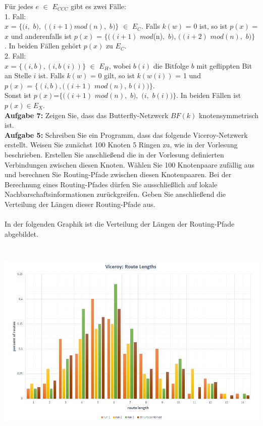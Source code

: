 \documentclass[12pt,a4paper]{report}
\begin{document}
Für jedes $e$ $\in$ $E_{CCC}$ gibt es zwei Fälle:\\
1. Fall:\\
$x$ = $\{(i,$ $b),$ $((i + 1)mod(n),$ $b)\}$ $\in$ $E_{C}$. Falls $k(w)$ = 0 ist, so ist $p(x)$ = $x$ und anderenfalls ist 
$p(x)$ = $\{((i + 1)$ $mod$(n)$,$ $b)$, $((i + 2)$ $mod(n),$ $b)\}$ . In beiden Fällen gehört $p(x)$ zu $E_{C}$.\\
2. Fall: \\
$x$ = $\{(i, b), (i, b(i))\}$ $\in$ $E_H$, wobei $b(i)$ die Bitfolge $b$ mit geflippten Bit an Stelle $i$ ist. Falls $k(w)$ = 0 gilt, so ist $k(w(i))$ = 1 und \\
$p(x)$ = $\{(i, b), ((i + 1)$ $mod(n)$, $b(i))\}$. \\
Sonst ist $p(x)$=$\{((i + 1)$ $mod(n),$ $b),$ $(i,$ $b(i))\}$. In beiden Fällen ist $p(x)\in E_X$. \\
\newpage
\textbf{Aufgabe 7:}
Zeigen Sie, dass das Butterfly-Netzwerk $BF(k)$ knotensymmetrisch ist.
\\



\textbf{Aufgabe 5:}
Schreiben Sie ein Programm, dass das folgende Viceroy-Netzwerk
erstellt. Weisen Sie zunächst 100 Knoten 5 Ringen zu, wie in der Vorlesung
beschrieben. Erstellen Sie anschließend die in der Vorlesung definierten
Verbindungen zwischen diesen Knoten. Wählen Sie 100 Knotenpaare
zufällig aus und berechnen Sie Routing-Pfade zwischen diesen Knotenpaaren.
Bei der Berechnung eines Routing-Pfades dürfen Sie ausschließlich auf
lokale Nachbarschaftsinformationen zurückgreifen. Geben Sie anschließend
die Verteilung der Längen dieser Routing-Pfade aus.
\\
\\
In der folgenden Graphik ist die Verteilung der Längen der Routing-Pfade abgebildet.
\begin{center}
	\includegraphics[height=10cm, width=15cm]{auswertung.png}
\end{center}
\end{document}
